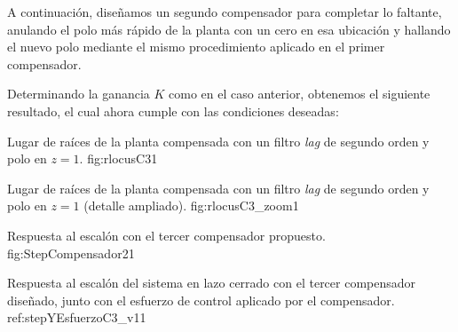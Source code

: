 A continuación, diseñamos un segundo compensador para completar lo faltante, anulando el polo más rápido de la planta con un cero en esa ubicación y hallando el nuevo polo mediante el mismo procedimiento aplicado en el primer compensador.

Determinando la ganancia $K$ como en el caso anterior, obtenemos el siguiente resultado, el cual ahora cumple con las condiciones deseadas:

{Lugar de raíces de la planta compensada con un filtro \emph{lag} de segundo orden y polo en $z=1$.}
{fig:rlocusC3}{1}

{Lugar de raíces de la planta compensada con un filtro \emph{lag} de segundo orden y polo en $z=1$ (detalle ampliado).}
{fig:rlocusC3_zoom}{1}

{Respuesta al escalón con el tercer compensador propuesto.}
{fig:StepCompensador2}{1}

{Respuesta al escal\'on del sistema en lazo cerrado con el tercer compensador dise\~nado, junto con el esfuerzo de control aplicado por el compensador.}
{ref:stepYEsfuerzoC3_v1}{1}

\balance
